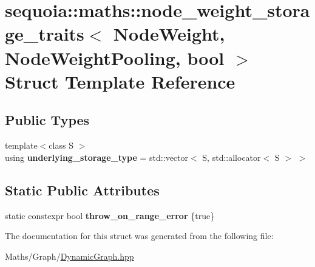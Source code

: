 \hypertarget{structsequoia_1_1maths_1_1node__weight__storage__traits}{}\section{sequoia\+::maths\+::node\+\_\+weight\+\_\+storage\+\_\+traits$<$ Node\+Weight, Node\+Weight\+Pooling, bool $>$ Struct Template Reference}
\label{structsequoia_1_1maths_1_1node__weight__storage__traits}
\subsection*{Public Types}
\begin{DoxyCompactItemize}
\item 
\mbox{\label{structsequoia_1_1maths_1_1node__weight__storage__traits_a53074937346b2e1f5a36b41dec3c4a2e}} 
{\footnotesize template$<$class S $>$ }\\using {\bfseries underlying\+\_\+storage\+\_\+type} = std\+::vector$<$ S, std\+::allocator$<$ S $>$ $>$
\end{DoxyCompactItemize}
\subsection*{Static Public Attributes}
\begin{DoxyCompactItemize}
\item 
\mbox{\label{structsequoia_1_1maths_1_1node__weight__storage__traits_a8f0fb85179b00deb385c136407d58dd0}} 
static constexpr bool {\bfseries throw\+\_\+on\+\_\+range\+\_\+error} \{true\}
\end{DoxyCompactItemize}


The documentation for this struct was generated from the following file\+:\begin{DoxyCompactItemize}
\item 
Maths/\+Graph/\mbox{\hyperlink{_dynamic_graph_8hpp}{Dynamic\+Graph.\+hpp}}\end{DoxyCompactItemize}
